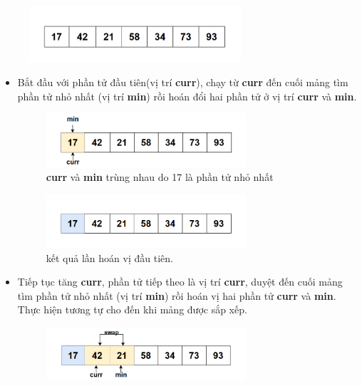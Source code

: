 \begin{figure}[H]
    \centering
    \includegraphics[width=0.7\textwidth]{img/selection sort/1.png}
    
\end{figure}

\begin{itemize}
\item Bắt đầu với phần tử đầu tiên(vị trí \textbf{curr}), chạy từ \textbf{curr} đến cuối mảng tìm phần tử nhỏ nhất (vị trí \textbf{min}) rồi hoán đổi hai phần tử ở vị trí \textbf{curr} và \textbf{min}. 
\begin{figure}[H]
    \centering
    \includegraphics[width=0.7\textwidth]{img/selection sort/2.png}
    \caption{\textbf{curr} và \textbf{min} trùng nhau do 17 là phần tử nhỏ nhất}
\end{figure}

\begin{figure}[H]
    \centering
    \includegraphics[width=0.7\textwidth]{img/selection sort/3.png}
    \caption{kết quả lần hoán vị đầu tiên.}
\end{figure}

\item Tiếp tục tăng \textbf{curr}, phần tử tiếp theo là vị trí \textbf{curr}, duyệt đến cuối mảng tìm phần tử nhỏ nhất (vị trí \textbf{min}) rồi hoán vị hai phần tử \textbf{curr} và \textbf{min}. Thực hiện tương tự cho đến khi mảng được sắp xếp.

\begin{figure}[H]
    \centering
    \includegraphics[width=0.7\textwidth]{img/selection sort/4.png}
    

\end{figure}
\end{itemize}
